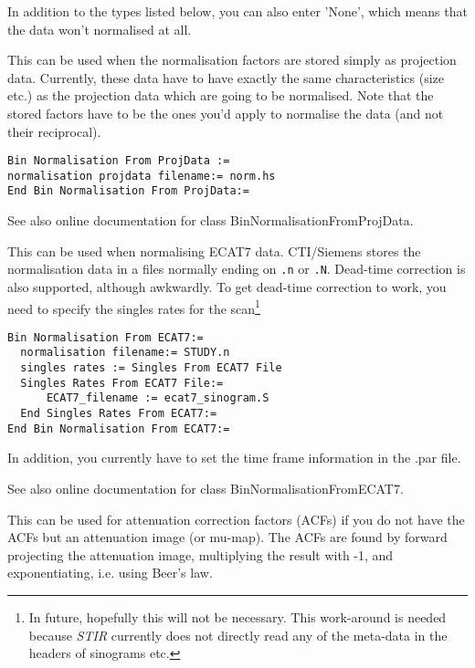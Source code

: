 \documentclass{article}
\begin{document}
In addition to the types listed below, you can also enter 'None', 
which means that the data won't normalised at all.

{ 
}

This can be used when the normalisation factors are stored simply 
as projection data. Currently, these data have to have exactly 
the same characteristics (size etc.) as the projection data which 
are going to be normalised. Note that the stored factors have 
to be the ones you'd apply to normalise the data (and not their 
reciprocal).

{ 
}
\begin{verbatim}
Bin Normalisation From ProjData :=
normalisation projdata filename:= norm.hs
End Bin Normalisation From ProjData:=
\end{verbatim}

See also online documentation for class BinNormalisationFromProjData.

{ 
}

This can be used when normalising ECAT7 data. CTI/Siemens stores
the normalisation data in a files normally ending on
\texttt{.n} or \texttt{.N}. Dead-time correction is also
supported, although awkwardly. To get dead-time correction
to work, you need to specify the singles rates for the 
scan\footnote{In future, hopefully this will not be necessary.
This work-around is needed because \textit{STIR} currently does not
directly read any of the meta-data in the headers of sinograms etc.}
{ 
}
\begin{verbatim}
Bin Normalisation From ECAT7:=
  normalisation filename:= STUDY.n
  singles rates := Singles From ECAT7 File
  Singles Rates From ECAT7 File:=
      ECAT7_filename := ecat7_sinogram.S
  End Singles Rates From ECAT7:=
End Bin Normalisation From ECAT7:=
\end{verbatim}

In addition, you currently have to set the time frame information in the .par file.

See also online documentation for class BinNormalisationFromECAT7.

{ 
}
\label{sec:binnormalisationfromattenuationimage}
This can be used for attenuation correction factors (ACFs) if 
you do not have the ACFs but an attenuation image (or mu-map). 
The ACFs are found by forward projecting the attenuation image, 
multiplying the result with -1, and exponentiating, i.e. using 
Beer's law.
\end{document}
